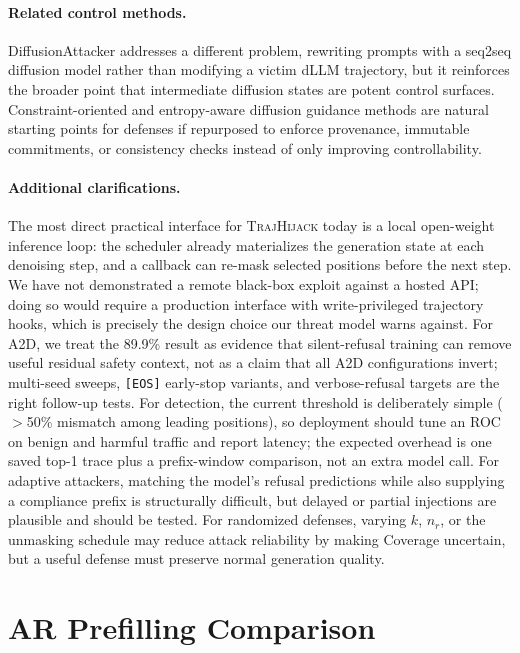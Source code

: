 \documentclass{article}
\theoremstyle{coloredthm}
\newcommand{\method}{\textsc{TrajHijack}}
\newcommand{\dllm}{dLLM}
\begin{document}
\paragraph{Related control methods.} DiffusionAttacker \citep{wang2025diffusionattacker} addresses a different problem, rewriting prompts with a seq2seq diffusion model rather than modifying a victim \dllm{} trajectory, but it reinforces the broader point that intermediate diffusion states are potent control surfaces. Constraint-oriented and entropy-aware diffusion guidance methods are natural starting points for defenses if repurposed to enforce provenance, immutable commitments, or consistency checks instead of only improving controllability.

\paragraph{Additional clarifications.} The most direct practical interface for \method{} today is a local open-weight inference loop: the scheduler already materializes the generation state at each denoising step, and a callback can re-mask selected positions before the next step. We have not demonstrated a remote black-box exploit against a hosted API; doing so would require a production interface with write-privileged trajectory hooks, which is precisely the design choice our threat model warns against. For A2D, we treat the 89.9\% result as evidence that silent-refusal training can remove useful residual safety context, not as a claim that all A2D configurations invert; multi-seed sweeps, \texttt{[EOS]} early-stop variants, and verbose-refusal targets are the right follow-up tests. For detection, the current threshold is deliberately simple ($>$50\% mismatch among leading positions), so deployment should tune an ROC on benign and harmful traffic and report latency; the expected overhead is one saved top-1 trace plus a prefix-window comparison, not an extra model call. For adaptive attackers, matching the model's refusal predictions while also supplying a compliance prefix is structurally difficult, but delayed or partial injections are plausible and should be tested. For randomized defenses, varying $k$, $n_r$, or the unmasking schedule may reduce attack reliability by making Coverage uncertain, but a useful defense must preserve normal generation quality.

\section{AR Prefilling Comparison}
\label{sec:ar_comparison_appendix}
\end{document}
